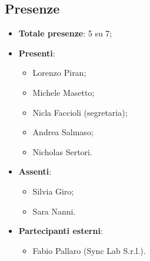 \documentclass[11pt]{article}
\begin{document}
		\subsection{Presenze}
			\begin{itemize}
				\item \textbf{Totale presenze}: 5 su 7;
				\item \textbf{Presenti}:
				\begin{itemize}
					\item Lorenzo Piran; 
					\item Michele Masetto;
					\item Nicla Faccioli (segretaria);
					\item Andrea Salmaso;
					\item Nicholas Sertori.
				\end{itemize}
				\item \textbf{Assenti}: 
					\begin{itemize}
						\item Silvia Giro;
						\item Sara Nanni.
					\end{itemize}
				\item \textbf{Partecipanti esterni}:
				\begin{itemize}
					\item Fabio Pallaro (Sync Lab S.r.l.).
				\end{itemize}
			\end{itemize}
		
		\newpage
		
\end{document}
